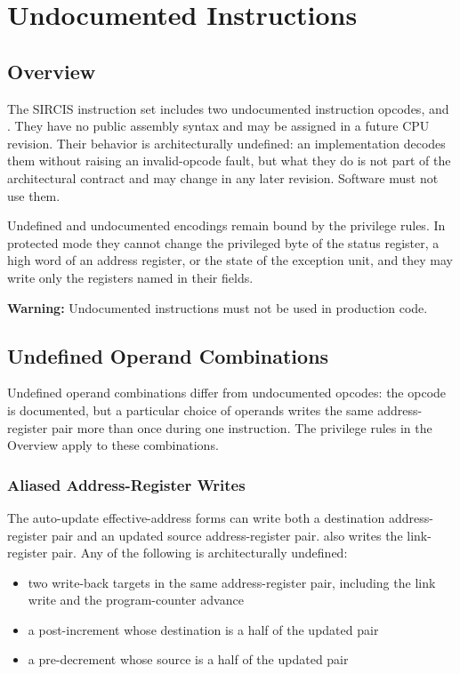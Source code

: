 \chapter{Undocumented Instructions}
\label{appendix:undocumented}

\section{Overview}

The SIRCIS instruction set includes two undocumented instruction opcodes,  and . They have no
public assembly syntax and may be assigned in a future CPU revision. Their behavior is architecturally undefined: an
implementation decodes them without raising an invalid-opcode fault, but what they do is not part of the architectural
contract and may change in any later revision. Software must not use them.

Undefined and undocumented encodings remain bound by the privilege rules. In protected mode they cannot change the
privileged byte of the status register, a high word of an address register, or the state of the exception unit, and
they may write only the registers named in their fields.

\textbf{Warning:} Undocumented instructions must not be used in production code.

\section{Undefined Operand Combinations}

Undefined operand combinations differ from undocumented opcodes: the opcode is documented, but a particular choice of
operands writes the same address-register pair more than once during one instruction. The privilege rules in the
Overview apply to these combinations.

\subsection{Aliased Address-Register Writes}

The auto-update effective-address forms can write both a destination address-register pair and an updated source
address-register pair.  also writes the link-register pair. Any of the following is architecturally
undefined:

\begin{itemize}
	\item two write-back targets in the same address-register pair, including the link write and the program-counter advance
	\item a  post-increment whose destination is a half of the updated pair
	\item a  pre-decrement whose source is a half of the updated pair
\end{itemize}

